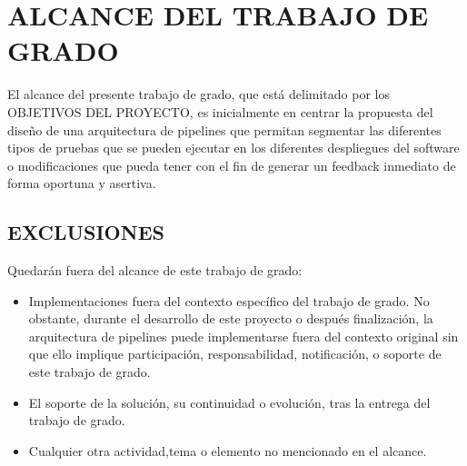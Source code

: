 \section{ALCANCE DEL TRABAJO DE GRADO }
El alcance del presente trabajo de grado, que está delimitado por los OBJETIVOS DEL PROYECTO, es inicialmente en centrar la propuesta del diseño de una arquitectura de pipelines que permitan segmentar las diferentes tipos de pruebas que se pueden ejecutar en los diferentes despliegues del software o modificaciones que pueda tener con el fin de generar un feedback inmediato de forma oportuna y asertiva.

\subsection{EXCLUSIONES}
Quedarán fuera del alcance de este trabajo de grado:

\begin{itemize}
    \item Implementaciones fuera del contexto específico del trabajo de grado. No obstante, durante el desarrollo de este proyecto o después finalización, la arquitectura de pipelines puede implementarse fuera del contexto original sin que ello implique participación, responsabilidad, notificación, o soporte de este trabajo de grado.
    \item El soporte de la solución, su continuidad o evolución, tras la entrega del trabajo de grado.
    \item Cualquier otra actividad,tema o elemento no mencionado en el alcance.
\end{itemize}